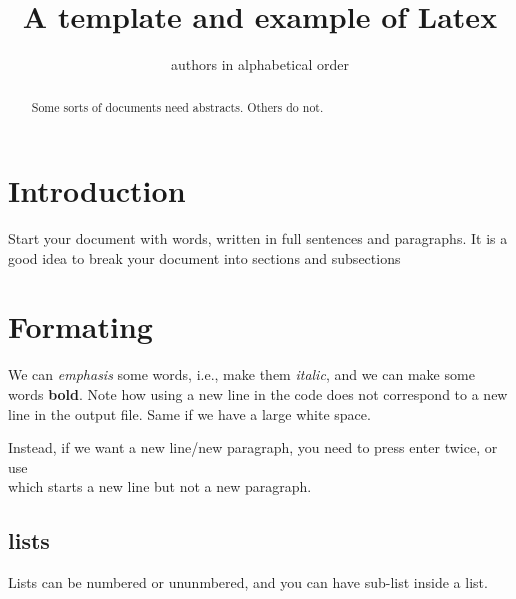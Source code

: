 \documentclass[a4paper,11pt]{article}
\theoremstyle{definition}
\begin{document}
	
\title{A template and example of Latex}
\author{authors in alphabetical order}
\date{}
\maketitle

\begin{abstract}
Some sorts of documents need abstracts. Others do not.
\end{abstract}


\section{Introduction}

Start your document with words, written in full sentences and paragraphs.
It is a good idea to break your document into sections and subsections

\section{Formating}

We can \emph{emphasis} some words, i.e., make them \emph{italic}, and we can make some words \textbf{bold}.
Note how using a new line in the code does not correspond to a new line in the output file.
Same if we have        a           large                white                   space.

Instead, if we want a new line/new paragraph, you need to press enter twice, or use \\
which starts a new line but not a new paragraph.

\subsection{lists}

Lists can be numbered or ununmbered, and you can have sub-list inside a list.
\end{document}
